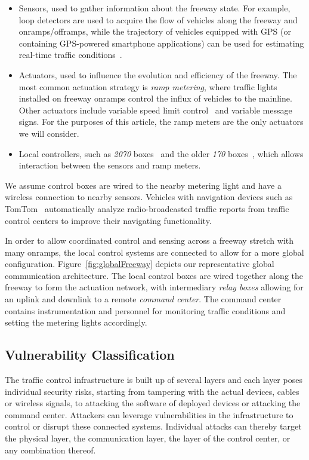     		\begin{itemize}
    			\item Sensors, used to gather information about the freeway state. For example, loop detectors are used to acquire the flow of vehicles along the freeway and onramps/offramps, while the trajectory of vehicles equipped with GPS (or containing GPS-powered smartphone applications) can be used for estimating real-time traffic conditions~\cite{work2010traffic}.
    			\item Actuators, used to influence the evolution and efficiency of the freeway. The most common actuation strategy is \emph{ramp metering}, where traffic lights installed on freeway onramps control the influx of vehicles to the mainline. Other actuators include variable speed limit control~\cite{Muralidharana} and variable message signs. For the purposes of this article, the ramp meters are the only actuators we will consider.
    			\item Local controllers, such as \emph{2070} boxes~\cite{AASHTO2012} and the older \emph{170} boxes~\cite{FHWA1978}, which allows interaction between the sensors and ramp meters.
    		\end{itemize}
    		We assume control boxes are wired to the nearby metering light and have a wireless connection to nearby sensors. Vehicles with navigation devices such as TomTom~\cite{tomtom} automatically analyze radio-broadcasted traffic reports from traffic control centers to improve their navigating functionality.
    
    		In order to allow coordinated control and sensing across a freeway stretch with many onramps, the local control systems are connected to allow for a more global configuration. Figure~\ref{fig:globalFreeway} depicts our representative global communication architecture. The local control boxes are wired together along the freeway to form the actuation network, with intermediary \emph{relay boxes} allowing for an uplink and downlink to a remote \emph{command center}. The command center contains instrumentation and personnel for monitoring traffic conditions and setting the metering lights accordingly.

\subsection{Vulnerability Classification}
\label{sec:traffic-system-vulnerabilities}

    The traffic control infrastructure is built up of several layers and each layer poses individual security risks, starting from tampering with the actual devices, cables or wireless signals, to attacking the software of deployed devices or attacking the command center.
    Attackers can leverage vulnerabilities in the infrastructure to control or disrupt these
    connected systems. Individual attacks can thereby target the physical layer, the
    communication layer, the layer of the control center, or any combination
    thereof.
    

